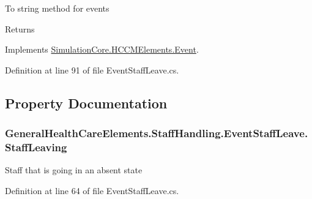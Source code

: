 To string method for events 

\begin{DoxyReturn}{Returns}

\end{DoxyReturn}


Implements \hyperlink{class_simulation_core_1_1_h_c_c_m_elements_1_1_event_a74668b01e4c7898939a3d98d6ee3a780}{Simulation\+Core.\+H\+C\+C\+M\+Elements.\+Event}.



Definition at line 91 of file Event\+Staff\+Leave.\+cs.



\subsection{Property Documentation}
\subsubsection[{\texorpdfstring{Staff\+Leaving}{StaffLeaving}}]{ General\+Health\+Care\+Elements.\+Staff\+Handling.\+Event\+Staff\+Leave.\+Staff\+Leaving\hspace{0.3cm}{\ttfamily [get]}}\hypertarget{class_general_health_care_elements_1_1_staff_handling_1_1_event_staff_leave_a6fce1b988dd5760d83eba97efdfe9b14}{}\label{class_general_health_care_elements_1_1_staff_handling_1_1_event_staff_leave_a6fce1b988dd5760d83eba97efdfe9b14}


Staff that is going in an absent state 



Definition at line 64 of file Event\+Staff\+Leave.\+cs.

